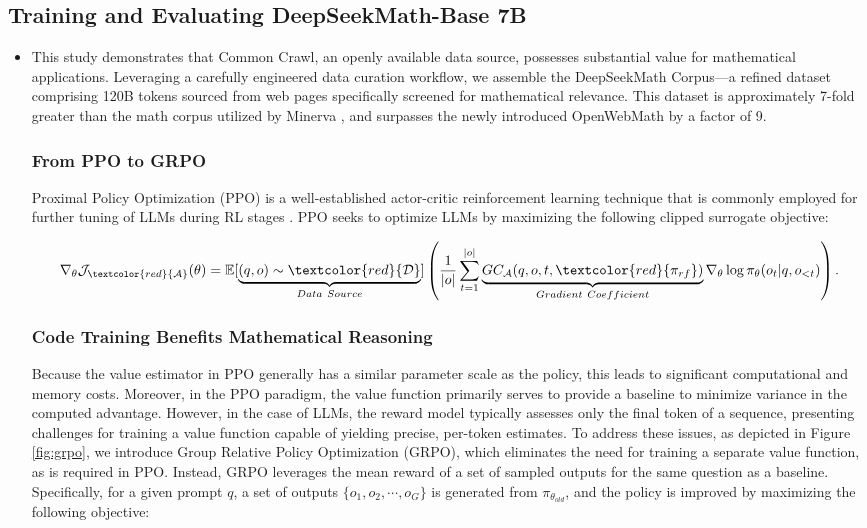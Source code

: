 \subsection{Training and Evaluating DeepSeekMath-Base 7B}

\begin{itemize}[topsep=0pt]
    \item This study demonstrates that Common Crawl, an openly available data source, possesses substantial value for mathematical applications. Leveraging a carefully engineered data curation workflow, we assemble the DeepSeekMath Corpus—a refined dataset comprising 120B tokens sourced from web pages specifically screened for mathematical relevance. This dataset is approximately 7-fold greater than the math corpus utilized by Minerva \citep{minerva}, and surpasses the newly introduced OpenWebMath \citep{openwebmath} by a factor of 9.

\subsubsection{From PPO to GRPO} Proximal Policy Optimization (PPO) \citep{schulman2017proximal} is a well-established actor-critic reinforcement learning technique that is commonly employed for further tuning of LLMs during RL stages \citep{ouyang2022training}. PPO seeks to optimize LLMs by maximizing the following clipped surrogate objective:

\begin{equation}
    \nabla_{\theta}\mathcal{J}_{\textcolor{red}{\mathcal{A}}}(\theta) = \mathbb{E}[\underbrace{(q,o) \sim \textcolor{red}{\mathcal{D}}}_{Data \ Source}]\left( \frac{1}{|o|} \sum_{t=1}^{|o|}  \underbrace{GC_{{\mathcal{A}}}(q, o, t, \textcolor{red}{\pi_{{rf}}})}_{Gradient \ Coefficient}  \nabla_{\theta}\log \pi_{\theta}(o_t | q, o_{<t})\right).
\label{eq:objective}
\end{equation}

\subsubsection{Code Training Benefits Mathematical Reasoning}

Because the value estimator in PPO generally has a similar parameter scale as the policy, this leads to significant computational and memory costs. Moreover, in the PPO paradigm, the value function primarily serves to provide a baseline to minimize variance in the computed advantage. However, in the case of LLMs, the reward model typically assesses only the final token of a sequence, presenting challenges for training a value function capable of yielding precise, per-token estimates. To address these issues, as depicted in Figure \ref{fig:grpo}, we introduce Group Relative Policy Optimization (GRPO), which eliminates the need for training a separate value function, as is required in PPO. Instead, GRPO leverages the mean reward of a set of sampled outputs for the same question as a baseline. Specifically, for a given prompt $q$, a set of outputs $\{o_1, o_2, \cdots, o_G\}$ is generated from $\pi_{\theta_{old}}$, and the policy is improved by maximizing the following objective:


\end{itemize}
